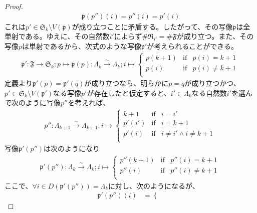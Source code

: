 \documentclass[dvipdfmx]{jsarticle}
\begin{document}
\begin{proof}
\begin{align*}
\mathfrak{p}\left( p'' \right)(i) = p''(i) = p'(i)
\end{align*}
これは$p' \in \mathfrak{S}_{k} \setminus V\left( \mathfrak{p} \right)$が成り立つことに矛盾する。したがって、その写像$\mathfrak{p}$は全単射である。ゆえに、その自然数$i'$によらず${\#}\mathfrak{R}_{i'} = {\#}\mathfrak{F}$が成り立つ。また、その写像$p$は単射であるから、次式のような写像$\mathfrak{p}'$が考えられることができる。
\begin{align*}
\mathfrak{p}'\mathfrak{:F \rightarrow}\mathfrak{S}_{k};p \mapsto \mathfrak{p}(p):\varLambda_{k}\overset{\sim}{\rightarrow}\varLambda_{k};i \mapsto \left\{ \begin{matrix}
p(k + 1) & \mathrm{if} & p(i) = k + 1 \\
p(i) & \mathrm{if} & p(i) \neq k + 1 \\
\end{matrix} \right.\ 
\end{align*}
定義より$\mathfrak{p}'(p) = \mathfrak{p}'(q)$が成り立つなら、明らかに$p = q$が成り立つかつ、$p' \in \mathfrak{S}_{k} \setminus V\left( \mathfrak{p}' \right)$なる写像$p'$が存在したと仮定すると、$i' \in \varLambda_{k}$なる自然数$i'$を選んで次のように写像$p''$を考えれば、
\begin{align*}
p'':\varLambda_{k + 1}\overset{\sim}{\rightarrow}\varLambda_{k + 1};i \mapsto \left\{ \begin{matrix}
k + 1 & \mathrm{if} & i = i' \\
p'\left( i' \right) & \mathrm{if} & i = k + 1 \\
p'(i) & \mathrm{if} & i \neq i' \land i \neq k + 1 \\
\end{matrix} \right.\ 
\end{align*}
写像$\mathfrak{p}'\left( p'' \right)$は次のようになり
\begin{align*}
\mathfrak{p}'\left( p'' \right):\varLambda_{k}\overset{\sim}{\rightarrow}\varLambda_{k};i \mapsto \left\{ \begin{matrix}
p''(k + 1) & \mathrm{if} & p''(i) = k + 1 \\
p''(i) & \mathrm{if} & p''(i) \neq k + 1 \\
\end{matrix} \right.\ 
\end{align*}
ここで、$\forall i \in D\left( \mathfrak{p}'\left( p'' \right) \right) = \varLambda_{k}$に対し、次のようになるが、
\begin{align*}
\mathfrak{p}'\left( p'' \right)(i) &= \left\{ \begin{matrix}

\end{matrix}
\end{align*}
\end{proof}
\end{document}
